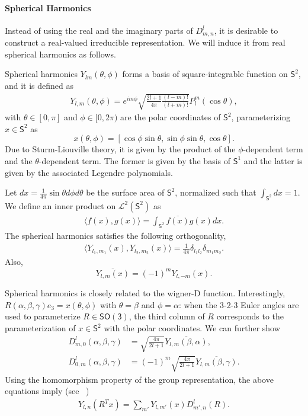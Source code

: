 \documentclass[onecolumn,11pt]{IEEEtran}
\newcommand{\pair}[1]{\ensuremath{\langle #1 \rangle}}
\newcommand{\SO}{\ensuremath{\mathsf{SO(3)}}}
\newcommand{\Sph}{\ensuremath{\mathsf{S}}}
\begin{document}
\paragraph{Spherical Harmonics}
Instead of using the real and the imaginary parts of $D^l_{m,n}$, it is desirable to construct a real-valued irreducible representation. 
We will induce it from real spherical harmonics as follows. 

Spherical harmonics $Y_{lm}(\theta,\phi)$ forms a basis of square-integrable function on $\Sph^2$, and it is defined as
\begin{align}
    Y_{l,m}(\theta,\phi) = e^{im\phi} \sqrt{\frac{2l+1}{4\pi}\frac{(l-m)!}{(l+m)!}}  P^m_l(\cos\theta),
\end{align}
with $\theta\in[0,\pi]$ and $\phi\in[0,2\pi)$ are the polar coordinates of $\Sph^2$, parameterizing $x\in\Sph^2$ as 
\[
    x(\theta,\phi)=[\cos\phi\sin\theta, \sin\phi\sin\theta, \cos\theta]. 
\]
Due to Sturm-Liouville theory, it is given by the product of the $\phi$-dependent term and the $\theta$-dependent term. 
The former is given by the basis of $\Sph^1$ and the latter is given by the associated Legendre polynomials. 

Let $dx=\frac{1}{4\pi} \sin\theta d\phi d\theta$ be the surface area of $\Sph^2$, normalized such that $\int_{\Sph^2} dx =1$. 
We define an inner product on $\mathcal{L}^2(\Sph^2)$ as
\begin{align*}
    \pair{ f(x), g(x) } = \int_{\Sph^2} \overline{f(x)}g(x) dx.
\end{align*}
The spherical harmonics satisfies the following orthogonality,
\begin{align*}
    \pair{ Y_{l_1,m_1}(x), Y_{l_2,m_2}(x)} = \frac{1}{4\pi} \delta_{l_1l_2} \delta_{m_1m_2}.
\end{align*}
Also,
\[
    \overline{Y_{l,m}(x)} = (-1)^m Y_{l,-m}(x).
\]

Spherical harmonics is closely related to the wigner-D function. 
Interestingly, $R(\alpha,\beta,\gamma)e_3=x(\theta,\phi)$ with $\theta=\beta$ and $\phi=\alpha$: when the 3-2-3 Euler angles are used to parameterize $R\in\SO$, the third column of $R$ corresponds to the parameterization of $x\in\Sph^2$ with the polar coordinates.  
We can further show
\begin{align*}
    D^l_{m,0}(\alpha,\beta,\gamma) &= \sqrt{\frac{4\pi}{2l+1}}\overline{Y_{l,m}(\beta,\alpha)},\\
    D^l_{0,m}(\alpha,\beta,\gamma) &= (-1)^m\sqrt{\frac{4\pi}{2l+1}}\overline{Y_{l,m}(\beta,\gamma)}.
\end{align*}
Using the homomorphism property of the group representation, the above equations imply (see ~\cite[pp. 342]{ChiKya01})
\begin{align*}
    Y_{l,n}(R^T x) = \sum_{m'} Y_{l,m'}(x) D^l_{m',n}(R) .
\end{align*}
\end{document}
